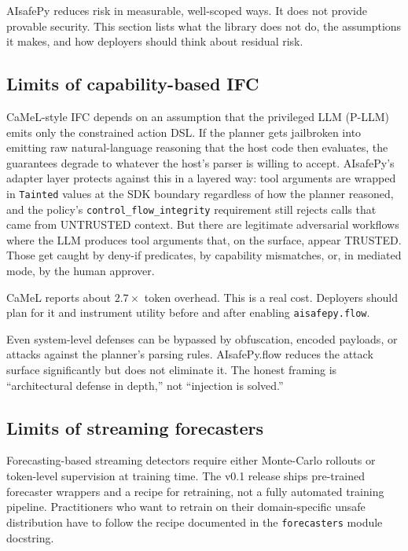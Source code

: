 AIsafePy reduces risk in measurable, well-scoped ways. It does not
provide provable security. This section lists what the library does
not do, the assumptions it makes, and how deployers should think
about residual risk.

\subsection{Limits of capability-based IFC}

CaMeL-style IFC depends on an assumption that the privileged LLM
(P-LLM) emits only the constrained action DSL. If the planner gets
jailbroken into emitting raw natural-language reasoning that the
host code then evaluates, the guarantees degrade to whatever the
host's parser is willing to accept. AIsafePy's adapter layer
protects against this in a layered way: tool arguments are wrapped
in \texttt{Tainted} values at the SDK boundary regardless of how
the planner reasoned, and the policy's
\texttt{control\_flow\_integrity} requirement still rejects calls
that came from UNTRUSTED context. But there are legitimate
adversarial workflows where the LLM produces tool arguments that,
on the surface, appear TRUSTED. Those get caught by deny-if
predicates, by capability mismatches, or, in mediated mode, by the
human approver.

CaMeL reports about $2.7\times$ token overhead. This is a real cost.
Deployers should plan for it and instrument utility before and
after enabling \texttt{aisafepy.flow}.

Even system-level defenses can be bypassed by obfuscation,
encoded payloads, or attacks against the planner's parsing rules.
AIsafePy.flow reduces the attack surface significantly but does
not eliminate it. The honest framing is ``architectural defense
in depth,'' not ``injection is solved.''

\subsection{Limits of streaming forecasters}

Forecasting-based streaming detectors require either Monte-Carlo
rollouts or token-level supervision at training time. The v0.1
release ships pre-trained forecaster wrappers and a recipe for
retraining, not a fully automated training pipeline. Practitioners
who want to retrain on their domain-specific unsafe distribution
have to follow the recipe documented in the \texttt{forecasters}
module docstring.

